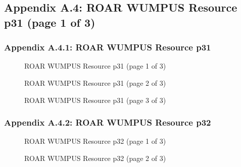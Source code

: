\documentclass{article}[11pt]
\begin{document}
\subsection{Appendix A.4: ROAR WUMPUS Resource p31 (page 1 of 3)}

\subsubsection{Appendix A.4.1: ROAR WUMPUS Resource p31}
\begin{figure}[h]
\begin{center}
\end{center}
\caption{ROAR WUMPUS Resource p31 (page 1 of 3)}
\label{fig:roar-wumpus-resource-p31-page1}
\end{figure}
\newline
\begin{figure}[h]
\begin{center}
\end{center}
\caption{ROAR WUMPUS Resource p31 (page 2 of 3)}
\label{fig:roar-wumpus-resource-p31-page2}
\end{figure}
\newline
\begin{figure}[h]
\begin{center}
\end{center}
\caption{ROAR WUMPUS Resource p31 (page 3 of 3)}
\label{fig:roar-wumpus-resource-p31-page3}
\end{figure}
\newline
\newpage

\subsubsection{Appendix A.4.2: ROAR WUMPUS Resource p32}
\begin{figure}[h]
\begin{center}
\end{center}
\caption{ROAR WUMPUS Resource p32 (page 1 of 3)}
\label{fig:roar-wumpus-resource-p32-page1}
\end{figure}
\newline
\begin{figure}[h]
\begin{center}
\end{center}
\caption{ROAR WUMPUS Resource p32 (page 2 of 3)}
\label{fig:roar-wumpus-resource-p32-page2}
\end{figure}
\newline
\newpage
\end{document}
